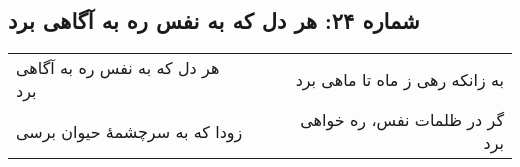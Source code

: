 \begin{center}
\section*{شماره ۲۴: هر دل که به نفس ره به آگاهی برد}
\label{sec:024}
\begin{longtable}{l p{0.5cm} r}
هر دل که به نفس ره به آگاهی برد
&&
به زانکه رهی ز ماه تا ماهی برد
\\
زودا که به سرچشمهٔ حیوان برسی
&&
گر در ظلمات نفس، ره خواهی برد
\\
\end{longtable}
\end{center}
